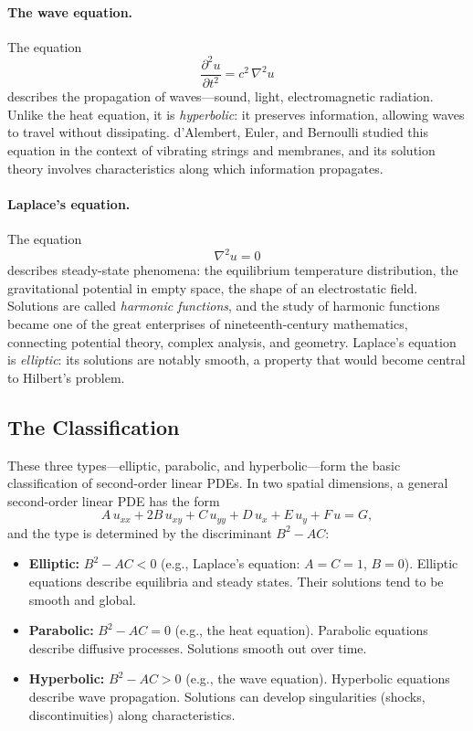 \paragraph{The wave equation.}
The equation
\[
    \frac{\partial^2 u}{\partial t^2} = c^2 \, \nabla^2 u
\]
describes the propagation of waves---sound, light, electromagnetic radiation. Unlike the heat equation, it is \emph{hyperbolic}: it preserves information, allowing waves to travel without dissipating. d'Alembert, Euler, and Bernoulli studied this equation in the context of vibrating strings and membranes, and its solution theory involves characteristics along which information propagates.

\paragraph{Laplace's equation.}
The equation
\[
    \nabla^2 u = 0
\]
describes steady-state phenomena: the equilibrium temperature distribution, the gravitational potential in empty space, the shape of an electrostatic field. Solutions are called \emph{harmonic functions}, and the study of harmonic functions became one of the great enterprises of nineteenth-century mathematics, connecting potential theory, complex analysis, and geometry. Laplace's equation is \emph{elliptic}: its solutions are notably smooth, a property that would become central to Hilbert's problem.

\subsection{The Classification}

These three types---elliptic, parabolic, and hyperbolic---form the basic classification of second-order linear PDEs. In two spatial dimensions, a general second-order linear PDE has the form
\[
    A \, u_{xx} + 2B \, u_{xy} + C \, u_{yy} + D \, u_x + E \, u_y + F \, u = G,
\]
and the type is determined by the discriminant $B^2 - AC$:
\begin{itemize}
    \item \textbf{Elliptic:} $B^2 - AC < 0$ (e.g., Laplace's equation: $A = C = 1$, $B = 0$). Elliptic equations describe equilibria and steady states. Their solutions tend to be smooth and global.
    \item \textbf{Parabolic:} $B^2 - AC = 0$ (e.g., the heat equation). Parabolic equations describe diffusive processes. Solutions smooth out over time.
    \item \textbf{Hyperbolic:} $B^2 - AC > 0$ (e.g., the wave equation). Hyperbolic equations describe wave propagation. Solutions can develop singularities (shocks, discontinuities) along characteristics.
\end{itemize}

